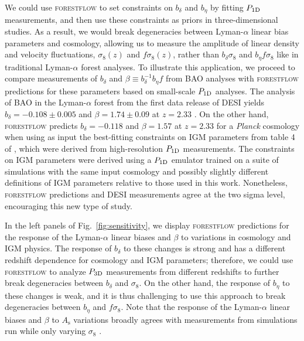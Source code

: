 \documentclass[longauth]{aa}
\newcommand{\lya}{Lyman-$\alpha$\xspace}
\newcommand{\lyaf}{Lyman-$\alpha$ forest\xspace}
\newcommand{\poned}{\ensuremath{P_{\rm 1D}}\xspace}
\newcommand{\pthreed}{\ensuremath{P_{\rm 3D}}\xspace}
\newcommand{\forestflow}{\textsc{forestflow}\xspace}
\begin{document}
We could use \forestflow to set constraints on $b_\delta$ and $b_\eta$ by fitting \poned measurements, and then use these constraints as priors in three-dimensional studies. As a result, we would break degeneracies between \lya linear bias parameters and cosmology, allowing us to measure the amplitude of linear density and velocity fluctuations, $\sigma_8(z)$ and $f \sigma_8(z)$, rather than $b_\delta \sigma_8$ and $b_\eta f \sigma_8$ like in traditional \lyaf analyses. To illustrate this application, we proceed to compare measurements of $b_\delta$ and $\beta\equiv b_\delta^{-1} b_\eta f$ from BAO analyses with \forestflow predictions for these parameters based on small-scale \poned analyses. The analysis of BAO in the \lyaf from the first data release of DESI yields $b_\delta=-0.108\pm0.005$ and $\beta=1.74\pm0.09$ at $z=2.33$ \citep{desicollaboration2024DESI2024IV}. On the other hand, \forestflow predicts $b_\delta=-0.118$ and $\beta=1.57$ at $z=2.33$ for a {\it Planck} cosmology when using as input the best-fitting constraints on IGM parameters from table 4 of \citet{emugp_Walther2019}, which were derived from high-resolution \poned measurements. The constraints on IGM parameters were derived using a \poned emulator trained on a suite of simulations with the same input cosmology and possibly slightly different definitions of IGM parameters relative to those used in this work. Nonetheless, \forestflow predictions and DESI measurements agree at the two sigma level, encouraging this new type of study.

In the left panels of Fig.~\ref{fig:sensitivity}, we display \forestflow predictions for the response of the \lya linear biases and $\beta$ to variations in cosmology and IGM physics. The response of $b_\delta$ to these changes is strong and has a different redshift dependence for cosmology and IGM parameters; therefore, we could use \forestflow to analyze \pthreed measurements from different redshifts to further break degeneracies between $b_\delta$ and $\sigma_8$. On the other hand, the response of $b_\eta$ to these changes is weak, and it is thus challenging to use this approach to break degeneracies between $b_\eta$ and $f \sigma_8$. Note that the response of the \lya linear biases and $\beta$ to $A_\mathrm{s}$ variations broadly agrees with measurements from simulations run while only varying $\sigma_8$ \citep{arinyo-i-prats2015NonlinearPowerSpectrum}.
\end{document}

